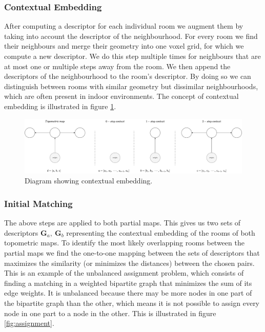 \subsubsection{Contextual Embedding}
After computing a descriptor for each individual room we augment them by taking into account the descriptor of the neighbourhood. For every room we find their neighbours and merge their geometry into one voxel grid, for which we compute a new descriptor. We do this step multiple times for neighbours that are at most one or multiple steps away from the room. We then append the descriptors of the neighbourhood to the room's descriptor. By doing so we can distinguish between rooms with similar geometry but dissimilar neighbourhoods, which are often present in indoor environments. The concept of contextual embedding is illustrated in figure \ref{fig:contextual_embedding}.

\begin{figure}[h]
    \centering
    \includegraphics*[width=\textwidth]{./fig/embed_context.pdf}
    \caption{Diagram showing contextual embedding.}
    \label{fig:contextual_embedding}
\end{figure}

\subsubsection{Initial Matching}
The above steps are applied to both partial maps. This gives us two sets of descriptors \(\mathbf{G}_a,\ \mathbf{G}_b\) representing the contextual embedding of the rooms of both topometric maps. To identify the most likely overlapping rooms between the partial maps we find the one-to-one mapping between the sets of descriptors that maximizes the similarity (or minimizes the distances) between the chosen pairs. This is an example of the unbalanced assignment problem, which consists of finding a matching in a weighted bipartite graph that minimizes the sum of its edge weights. It is unbalanced because there may be more nodes in one part of the bipartite graph than the other, which means it is not possible to assign every node in one part to a node in the other. This is illustrated in figure \ref{fig:assignment}.

